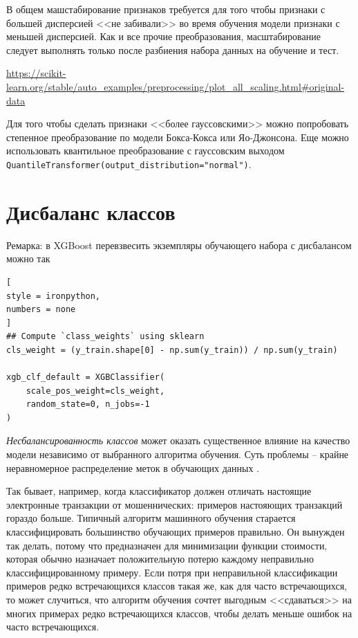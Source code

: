 \documentclass[%
	11pt,
	a4paper,
	utf8,
		]{article}
\begin{document}
В общем машстабирование признаков требуется для того чтобы признаки с б\emph{о}льшей дисперсией <<не забивали>> во время обучения модели признаки с меньшей дисперсией. Как и все прочие преобразования, масштабирование следует выполнять только после разбиения набора данных на обучение и тест.

\url{https://scikit-learn.org/stable/auto_examples/preprocessing/plot_all_scaling.html#original-data}

Для того чтобы сделать признаки <<более гауссовскими>> можно попробовать степенное преобразование по модели Бокса-Кокса или Яо-Джонсона. Еще можно использовать квантильное преобразование с гауссовским выходом \verb|QuantileTransformer(output_distribution="normal")|.




\section{Дисбаланс классов}

Ремарка: в XGBoost перевзвесить экземпляры обучающего набора с дисбалансом можно так
\begin{lstlisting}[
style = ironpython,
numbers = none
]
## Compute `class_weights` using sklearn
cls_weight = (y_train.shape[0] - np.sum(y_train)) / np.sum(y_train)

xgb_clf_default = XGBClassifier(
    scale_pos_weight=cls_weight,
    random_state=0, n_jobs=-1
)
\end{lstlisting}

\emph{Несбалансированность классов} может оказать существенное влияние на качество модели независимо от выбранного алгоритма обучения. Суть проблемы -- крайне неравномерное распределение меток в обучающих данных \cite[]{burkov-engineer:2022}.

Так бывает, например, когда классификатор должен отличать настоящие электронные транзакции от мошеннических: примеров настояющих транзакций гораздо больше. Типичный алгоритм машинного обучения старается классифицировать большинство обучающих примеров правильно. Он вынужден так делать, потому что предназначен для минимизации функции стоимости, которая обычно назначает положительную потерю каждому неправильно классифицированному примеру. Если потря при неправильной классификации примеров редко встречающихся классов такая же, как для часто встречающихся, то может случиться, что алгоритм обучения сочтет выгодным <<сдаваться>> на многих примерах редко встречающихся классов, чтобы делать  меньше ошибок на часто встречающихся.
\end{document}
